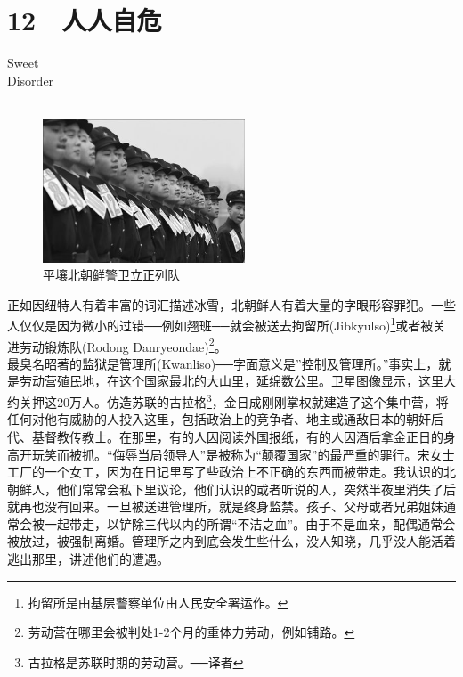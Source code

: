 \fancyhead[RO]{{\tiny{\textcolor{Gray}{\FA \ }}}\thepage}
\fancyhead[LE]{{\tiny{\textcolor{Gray}{\FA \ }}}\thepage}
\fancyfoot[LE,RO]{}
\fancyfoot[LO,CE]{}
\fancyfoot[CO,RE]{}
\chapter*{12 {\FA } 人人自危}
\vspace{5mm}
\begin{flushright}
	\textcolor{PinYinColor}{\EN \huge{Sweet\\
	Disorder\\
	\ \\}}
\end{flushright}
\begin{figure}[!htbp]
	\centering
	\includegraphics[width=6cm]{./Chapters/Images/12.jpg}
	\caption*{平壤北朝鲜警卫立正列队}
\end{figure}


正如因纽特人有着丰富的词汇描述冰雪，北朝鲜人有着大量的字眼形容罪犯。一些人仅仅是因为微小的过错──例如翘班──就会被送去拘留所(Jibkyulso)\footnote{拘留所是由基层警察单位由人民安全署运作。}或者被关进劳动锻炼队(Rodong Danryeondae)\footnote{劳动营在哪里会被判处1-2个月的重体力劳动，例如铺路。}。\\

最臭名昭著的监狱是管理所(Kwanliso)──字面意义是”控制及管理所。”事实上，就是劳动营殖民地，在这个国家最北的大山里，延绵数公里。卫星图像显示，这里大约关押这20万人。仿造苏联的古拉格\footnote{古拉格是苏联时期的劳动营。──译者}，金日成刚刚掌权就建造了这个集中营，将任何对他有威胁的人投入这里，包括政治上的竞争者、地主或通敌日本的朝奸后代、基督教传教士。在那里，有的人因阅读外国报纸，有的人因酒后拿金正日的身高开玩笑而被抓。“侮辱当局领导人”是被称为“颠覆国家”的最严重的罪行。宋女士工厂的一个女工，因为在日记里写了些政治上不正确的东西而被带走。我认识的北朝鲜人，他们常常会私下里议论，他们认识的或者听说的人，突然半夜里消失了后就再也没有回来。一旦被送进管理所，就是终身监禁。孩子、父母或者兄弟姐妹通常会被一起带走，以铲除三代以内的所谓“不洁之血”。由于不是血亲，配偶通常会被放过，被强制离婚。管理所之内到底会发生些什么，没人知晓，几乎没人能活着逃出那里，讲述他们的遭遇。\\

